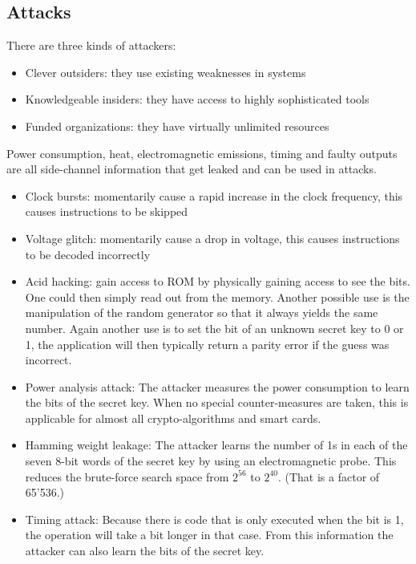 \subsection{Attacks}
\begin{mytitle} There are three kinds of attackers:
\begin{itemize}
    \item Clever outsiders: they use existing weaknesses in systems
    \item Knowledgeable insiders: they have access to highly sophisticated tools
    \item Funded organizations: they have virtually unlimited resources
\end{itemize}
\end{mytitle}
\begin{mytitle}[Leakage] Power consumption, heat, electromagnetic emissions, timing and faulty outputs are all side-channel information that get leaked and can be used in attacks.
\end{mytitle}
\begin{mytitle}\hfill
\begin{itemize}
    \item Clock bursts: momentarily cause a rapid increase in the clock frequency, this causes instructions to be skipped
    \item Voltage glitch: momentarily cause a drop in voltage, this causes instructions to be decoded incorrectly
    \item Acid hacking: gain access to ROM by physically gaining access to see the bits. One could then simply read out from the memory. Another possible use is the  manipulation of the random generator so that it always yields the same number. Again another use is to set the bit of an unknown secret key to 0 or 1, the application will then typically return a parity error if the guess was incorrect. 
\end{itemize}
\end{mytitle}
\begin{mytitle}\hfill
\begin{itemize}
    \item Power analysis attack: The attacker measures the power consumption to learn the bits of the secret key. When no special counter-measures are taken, this is applicable for almost all crypto-algorithms and smart cards.
    \item Hamming weight leakage: The attacker learns the number of 1s in each of the seven 8-bit words of the secret key by using an electromagnetic probe. This reduces the brute-force search space from $2^{56}$ to $2^{40}$. (That is a factor of 65'536.)
    \item Timing attack: Because there is code that is only executed when the bit is 1, the operation will take a bit longer in that case. From this information the attacker can also learn the bits of the secret key.
\end{itemize}
\end{mytitle}

